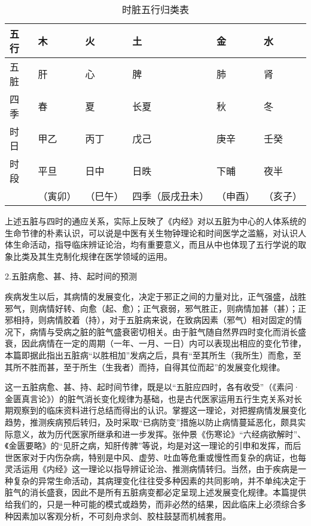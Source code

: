 \documentclass[12pt]{ctexbook}
\begin{document}
\begin{table}[htb]%
  \centering
  \caption{时脏五行归类表}\label{tab:时脏五行归类表}
  \begin{tabu}to.87
    \toprule
    五行 & 木       & 火      & 土              & 金      & 水      \\
    \midrule
    五脏 & 肝       & 心      & 脾              & 肺      & 肾      \\
    四季 & 春       & 夏      & 长夏            & 秋      & 冬      \\
    时日 & 甲乙     & 丙丁    & 戊己            & 庚辛    & 壬癸    \\
    时段 & 平旦     & 日中    & 日昳            & 下晡    & 夜半    \\
         &（寅卯）  & （巳午）& 四季（辰戌丑未）&（申酉） &（亥子）\\
    \bottomrule
  \end{tabu}
\end{table}
上述五脏与四时的通应关系，实际上反映了《内经》对以五脏为中心的人体系统的生命节律的朴素认识，可以说是中医有关生物钟理论和时间医学之滥觞，对认识人体生命活动，指导临床辨证论治，均有重要意义，而且从中也体现了五行学说的取象比类及其生克制化规律在医学领域的运用。

2.五脏病愈、甚、持、起时间的预测

疾病发生以后，其病情的发展变化，决定于邪正之间的力量对比，正气强盛，战胜邪气，则病情好转、向愈（起、愈）；正气衰弱，邪气胜正，则病情加甚（甚）；正邪相持，则病情胶着（持），对于五脏病来说，在致病因素（邪气）相对固定的情况下，病情与受病之脏的脏气盛衰密切相关。由于脏气随自然界四时变化而消长盛衰，因此病情在一定的周期（一年、一月、一日）内可以表现出相应的变化节律，本篇即据此指出五脏病“以胜相加”发病之后，具有“至其所生（我所生）而愈，至其所不胜而甚，至于所生（生我者）而持，自得其位而起”的发展变化规律。

这一五脏病愈、甚、持、起时间节律，既是以“五脏应四时，各有收受”（《素问·金匮真言论》）的脏气消长变化规律为基础，也是古代医家运用五行生克关系对长期观察到的临床资料进行总结而得出的认识。掌握这一理论，对把握病情发展变化趋势，推测疾病预后转归，及时采取“已病防变”措施以防止病情蔓延恶化，颇具实际意义，故为历代医家所继承和进一步发挥。张仲景《伤寒论》“六经病欲解时”、《金匮要略》的“见肝之病，知肝传脾”等说，均是对这一理论的引申和发挥，而后世医家对于内伤杂病，特别是中风、虚劳、吐血等危重或慢性而复杂的病证，也每灵活运用《内经》这一理论以指导辨证论治、推测病情转归。当然，由于疾病是一种复杂的异常生命活动，其病理变化往往受多种因素的共同影响，并不单纯决定于脏气的消长盛衰，因此不是所有五脏病变都必定呈现上述发展变化规律。本篇提供给我们的，只是一种可能的模式或趋势，而非必然的结果，因此临床上必须综合多种因素加以客观分析，不可刻舟求剑、胶柱鼓瑟而机械套用。
\end{document}
